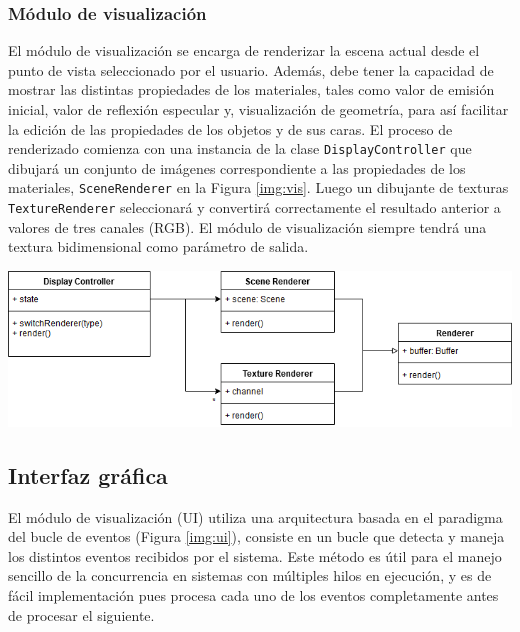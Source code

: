 \subsubsection{Módulo de visualización}

El módulo de visualización se encarga de renderizar la escena actual desde el punto de vista seleccionado por el usuario. Además, debe tener la capacidad de mostrar las distintas propiedades de los materiales, tales como valor de emisión inicial, valor de reflexión especular y, visualización de geometría, para así facilitar la edición de las propiedades de los objetos y de sus caras. El proceso de renderizado comienza con una instancia de la clase \verb|DisplayController| que dibujará un conjunto de imágenes correspondiente a las propiedades de los materiales, \verb|SceneRenderer| en la Figura \ref{img:vis}. Luego un dibujante de texturas \verb|TextureRenderer| seleccionará y convertirá correctamente el resultado anterior a valores de tres canales (RGB). El módulo de visualización siempre tendrá una textura bidimensional como parámetro de salida.

\vspace{5mm}
\begin{minipage}[h]{0.8\linewidth}
	\centering
	\includegraphics[width=\linewidth]{assets/display}
	\label{img:vis}
\end{minipage}

\subsection{Interfaz gráfica}

El módulo de visualización (UI) utiliza una arquitectura basada en el paradigma del bucle de eventos (Figura \ref{img:ui}), consiste en un bucle que detecta y maneja los distintos eventos recibidos por el sistema. Este método es útil para el manejo sencillo de la concurrencia en sistemas con múltiples hilos en ejecución, y es de fácil implementación pues procesa cada uno de los eventos completamente antes de procesar el siguiente.

